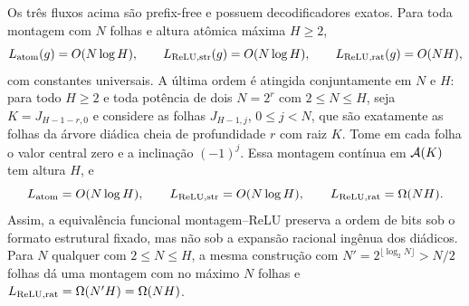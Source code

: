 \begin{theorem}\label{map:artigo_2:3.12}
\label{artigo_2:thm:coding-formats}
Os três fluxos acima são prefix-free e possuem decodificadores exatos. Para
toda montagem com $N$ folhas e altura atômica máxima $H\ge2$,
\begin{equation}
 L_{\rm atom}(g)=O(N\log H),\qquad
 L_{\rm ReLU,str}(g)=O(N\log H),\qquad
 L_{\rm ReLU,rat}(g)=O(NH),
 \label{artigo_2:eq:coding-format-orders}
\end{equation}
com constantes universais. A última ordem é atingida conjuntamente em $N$ e
$H$: para todo $H\ge2$ e toda potência de dois $N=2^r$ com $2\le N\le H$, seja
$K=J_{H-1-r,0}$ e considere as folhas $J_{H-1,j}$, $0\le j<N$, que são
exatamente as folhas da árvore diádica cheia de profundidade $r$ com raiz $K$.
Tome em cada folha o valor central zero e a inclinação $(-1)^j$.
Essa montagem contínua em $\mathcal{A}(K)$ tem altura $H$, e
\begin{equation}
 L_{\rm atom}=O(N\log H),\qquad
 L_{\rm ReLU,str}=O(N\log H),\qquad
 L_{\rm ReLU,rat}=\Omega(NH).
 \label{artigo_2:eq:coding-gap-family}
\end{equation}
Assim, a equivalência funcional montagem--ReLU preserva a ordem de bits sob o
formato estrutural fixado, mas não sob a expansão racional ingênua dos
diádicos. Para $N$ qualquer com $2\le N\le H$, a mesma construção com
$N'=2^{\lfloor\log_2N\rfloor}>N/2$ folhas dá uma montagem com no máximo $N$
folhas e $L_{\rm ReLU,rat}=\Omega(N'H)=\Omega(NH)$.
\end{theorem}

